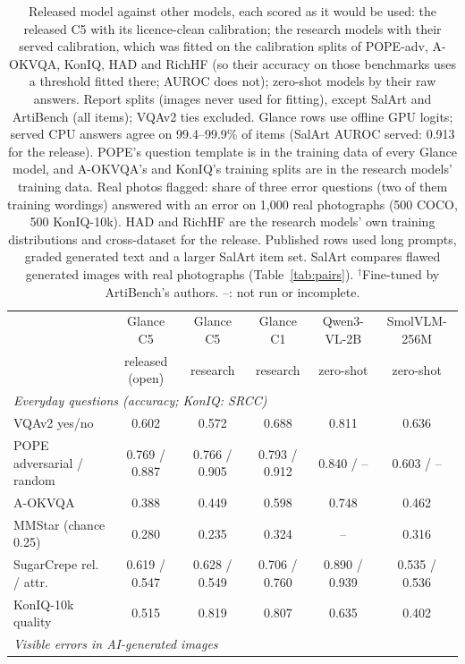 \documentclass[10pt]{article}
\begin{document}
\begin{table}[t]
\centering\footnotesize
\caption{Released model against other models, each scored as it would be used: the released C5 with its licence-clean calibration; the research models with their served calibration, which was fitted on the calibration splits of POPE-adv, A-OKVQA, KonIQ, HAD and RichHF (so their accuracy on those benchmarks uses a threshold fitted there; AUROC does not); zero-shot models by their raw answers. Report splits (images never used for fitting), except SalArt and ArtiBench (all items); VQAv2 ties excluded. Glance rows use offline GPU logits; served CPU answers agree on 99.4--99.9\% of items (SalArt AUROC served: 0.913 for the release). POPE's question template is in the training data of every Glance model, and A-OKVQA's and KonIQ's training splits are in the research models' training data. Real photos flagged: share of three error questions (two of them training wordings) answered with an error on 1{,}000 real photographs (500 COCO, 500 KonIQ-10k). HAD and RichHF are the research models' own training distributions and cross-dataset for the release. Published rows used long prompts, graded generated text and a larger SalArt item set. SalArt compares flawed generated images with real photographs (Table~\ref{tab:pairs}). $^\dagger$Fine-tuned by ArtiBench's authors. --: not run or incomplete.}
\label{tab:final}
\setlength\tabcolsep{2pt}
\begin{tabular}{lccccc}
\toprule
 & Glance C5 & Glance C5 & Glance C1 & Qwen3-VL-2B & SmolVLM-256M \\
 & released (open) & research & research & zero-shot & zero-shot \\
\midrule
\multicolumn{6}{l}{\emph{Everyday questions (accuracy; KonIQ: SRCC)}} \\
VQAv2 yes/no & 0.602 & 0.572 & 0.688 & 0.811 & 0.636 \\
POPE adversarial / random & 0.769 / 0.887 & 0.766 / 0.905 & 0.793 / 0.912 & 0.840 / -- & 0.603 / -- \\
A-OKVQA & 0.388 & 0.449 & 0.598 & 0.748 & 0.462 \\
MMStar (chance 0.25) & 0.280 & 0.235 & 0.324 & -- & 0.316 \\
SugarCrepe rel. / attr. & 0.619 / 0.547 & 0.628 / 0.549 & 0.706 / 0.760 & 0.890 / 0.939 & 0.535 / 0.536 \\
KonIQ-10k quality & 0.515 & 0.819 & 0.807 & 0.635 & 0.402 \\
\midrule
\multicolumn{6}{l}{\emph{Visible errors in AI-generated images}} \\

\end{tabular}
\end{table}
\end{document}
